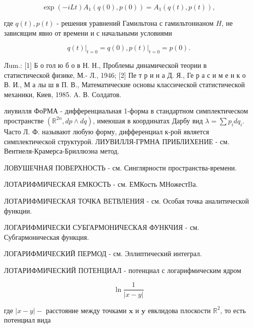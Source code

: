 \documentclass[10pt]{article}
\begin{document}
\[

\exp (-i L t) A_{1}(q(0), p(0))=A_{1}(q(t), p(t)),

\]



где $q(t), p(t)$ - решения уравнений Гамильтона с гамильтонианом $H$, не зависящим явно от времени и с начальными условиями



\[

\left.q(t)\right|_{t=0}=q(0),\left.p(t)\right|_{t=0}=p(0) .

\]



Лum.: [1] Б о гол ю б о в Н. Н., Проблемы динамической теории в статистической физике, М.- Л., 1946; [2] Пе т р и н а Д. Я., Ге р а с и м е н к о В. И., М а лы ш в П. В., Математические основы классической статистической механики, Киев, 1985. A. В. Солдатов.



лиувилля ФоРМА - дифференциальная 1-форма в стандартном симплектическом пространстве $\left(\mathbb{R}^{2 n}, d p \wedge d q\right)$, имеюшая в координатах Дарбу вид $\lambda=\sum p_{i} d q_{i}$. Часто Л. Ф. называют любую форму, дифференциал к-рой является симплектической структурой. ЛИУВИЛЛЯ-ГРМНА ПРИБЛИХЕНИЕ - см. Вентиеля-Крамерса-Бриллюэна метод.



ЛОВУШЕЧНАЯ ПОВЕРХНОСТЬ - см. Синглярности пространства-времени.



ЛОТАРИФМИЧЕСКАЯ ЕМКОСТЬ - см. ЕМКость МНожестBа.



ЛОТАРИФМИЧЕСКАЯ ТОЧКА ВЕТВЛЕНИЯ - см. Особая точка аналитической функции.



ЛОГАРИФМИЧЕСКИ СУБГАРМОНИЧЕСКАЯ ФУНКЧИЯ - см. Субгармоническая функция.



ЛОГАРИФМИЧЕСКИЙ ПЕРМОД - см. Эллиптический интеграл.



ЛОТАРИФМИЧЕСКИЙ ПОТЕНЦИАЛ - потенциал с логарифмическим ядром



\[

\ln \frac{1}{|x-y|}

\]



где $|x-y|-$ расстояние между точками $\boldsymbol{x}$ и $\boldsymbol{y}$ евклидова плоскости $\mathbb{R}^{2}$, то есть потенциал вида
\end{document}
